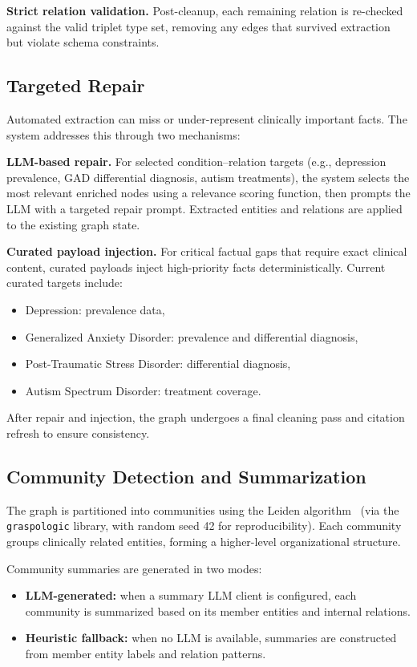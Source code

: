 \documentclass[12pt,a4paper]{article}
\begin{document}
\textbf{Strict relation validation.} Post-cleanup, each remaining relation is re-checked against the valid triplet type set, removing any edges that survived extraction but violate schema constraints.

\subsection{Targeted Repair}

Automated extraction can miss or under-represent clinically important facts. The system addresses this through two mechanisms:

\textbf{LLM-based repair.} For selected condition--relation targets (e.g., depression prevalence, GAD differential diagnosis, autism treatments), the system selects the most relevant enriched nodes using a relevance scoring function, then prompts the LLM with a targeted repair prompt. Extracted entities and relations are applied to the existing graph state.

\textbf{Curated payload injection.} For critical factual gaps that require exact clinical content, curated payloads inject high-priority facts deterministically. Current curated targets include:
\begin{itemize}[nosep]
    \item Depression: prevalence data,
    \item Generalized Anxiety Disorder: prevalence and differential diagnosis,
    \item Post-Traumatic Stress Disorder: differential diagnosis,
    \item Autism Spectrum Disorder: treatment coverage.
\end{itemize}

After repair and injection, the graph undergoes a final cleaning pass and citation refresh to ensure consistency.

\subsection{Community Detection and Summarization}

The graph is partitioned into communities using the Leiden algorithm~\cite{traag2019leiden} (via the \texttt{graspologic} library, with random seed 42 for reproducibility). Each community groups clinically related entities, forming a higher-level organizational structure.

Community summaries are generated in two modes:
\begin{itemize}[nosep]
    \item \textbf{LLM-generated:} when a summary LLM client is configured, each community is summarized based on its member entities and internal relations.
    \item \textbf{Heuristic fallback:} when no LLM is available, summaries are constructed from member entity labels and relation patterns.
\end{itemize}
\end{document}

